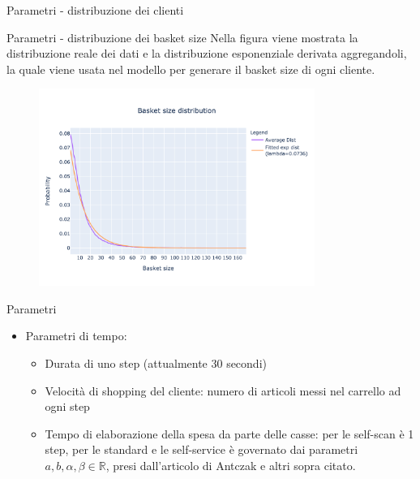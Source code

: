 \begin{frame}{Parametri - distribuzione dei clienti}
\end{frame}

\begin{frame}{Parametri - distribuzione dei basket size}
	Nella figura viene mostrata la distribuzione reale dei dati e la distribuzione esponenziale derivata aggregandoli, la quale viene usata nel modello per generare il basket size di ogni cliente.
	\begin{figure}[H]
		\centering
		\includegraphics[width=9cm]{"../report/images/basket_size_fitted.png"}
		\label{fig:dist_basket_size}
	\end{figure}
\end{frame}

\begin{frame}{Parametri}
	\begin{itemize}
		\item Parametri di tempo:
		\begin{itemize}
			\item Durata di uno step (attualmente 30 secondi)
			\item Velocità di shopping del cliente: numero di articoli messi nel carrello ad ogni step
			\item Tempo di elaborazione della spesa da parte delle casse: per le self-scan è 1 step, per le standard e le self-service è governato dai parametri $a, b, \alpha, \beta \in \mathbb{R}$, presi dall'articolo di Antczak e altri sopra citato.
		\end{itemize}
	\end{itemize}
\end{frame}